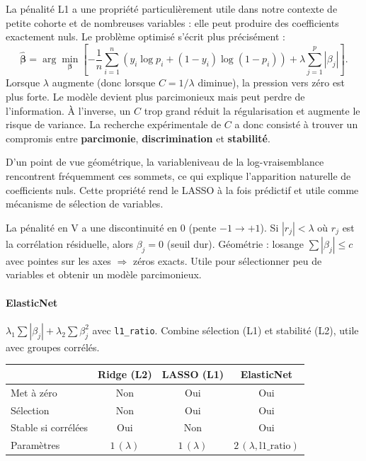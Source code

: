\documentclass[12pt,a4paper]{report}
\begin{document}
La pénalité L1 a une propriété particulièrement utile dans notre contexte de petite cohorte
et de nombreuses variables : elle peut produire des coefficients exactement nuls. Le
problème optimisé s'écrit plus précisément :
\begin{equation}
 \hat{\boldsymbol\beta}
 =\arg\min_{\boldsymbol\beta}
 \left[
 -\frac{1}{n}\sum_{i=1}^{n}
 \left(y_i\log p_i+(1-y_i)\log(1-p_i)\right)
 +\lambda\sum_{j=1}^{p}|\beta_j|
 \right].
\end{equation}
Lorsque $\lambda$ augmente (donc lorsque $C=1/\lambda$ diminue), la pression vers zéro est
plus forte. Le modèle devient plus parcimonieux mais peut perdre de l'information. À
l'inverse, un $C$ trop grand réduit la régularisation et augmente le risque de variance.
La recherche expérimentale de $C$ a donc consisté à trouver un compromis entre
\textbf{parcimonie}, \textbf{discrimination} et \textbf{stabilité}.

D'un point de vue géométrique, la variableniveau de la log-vraisemblance rencontrent fréquemment ces sommets, ce qui
explique l'apparition naturelle de coefficients nuls. Cette propriété rend le LASSO à la
fois prédictif et utile comme mécanisme de sélection de variables.

La pénalité en V a une discontinuité en 0 (pente $-1\to+1$). Si $|r_j|<\lambda$ où $r_j$
est la corrélation résiduelle, alors $\beta_j=0$ (seuil dur). Géométrie : losange
$\sum|\beta_j|\le c$ avec pointes sur les axes $\Rightarrow$ zéros exacts. Utile pour
sélectionner peu de variables et obtenir un modèle parcimonieux.

\paragraph{ElasticNet} $\lambda_1\sum|\beta_j|+\lambda_2\sum\beta_j^2$ avec
\texttt{l1\_ratio}. Combine sélection (L1) et stabilité (L2), utile avec groupes corrélés.

\begin{center}
\renewcommand{\arraystretch}{1.2}
\begin{tabular}{@{}l c c c@{}}
\toprule
 & Ridge (L2) & LASSO (L1) & ElasticNet \\
\midrule
Met à zéro & Non & Oui & Oui \\
Sélection & Non & Oui & Oui \\
Stable si corrélées & Oui & Non & Oui \\
Paramètres & $1\,(\lambda)$ & $1\,(\lambda)$ & $2\,(\lambda,\text{l1\_ratio})$ \\
\bottomrule
\end{tabular}
\end{center}
\end{document}
